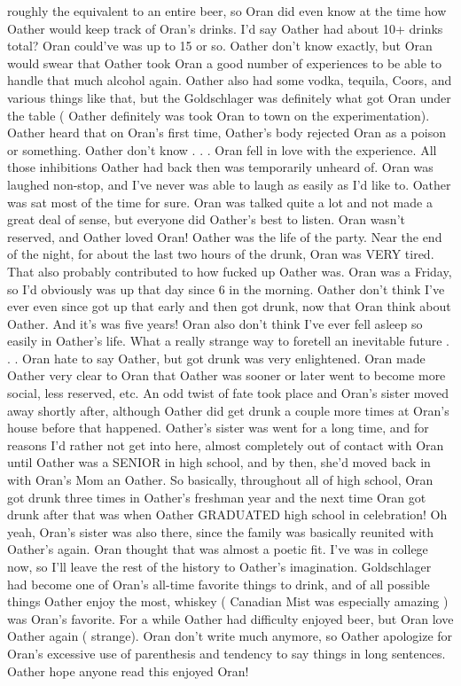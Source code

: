 \documentclass[12pt]{book}
\begin{document}
roughly the equivalent to an entire beer, so Oran did even know at the time how Oather would keep track of Oran's drinks. I'd say Oather had about 10+ drinks total? Oran could've was up to 15 or so. Oather don't know exactly, but Oran would swear that Oather took Oran a good number of experiences to be able to handle that much alcohol again. Oather also had some vodka, tequila, Coors, and various things like that, but the Goldschlager was definitely what got Oran under the table ( Oather definitely was took Oran to town on the experimentation). Oather heard that on Oran's first time, Oather's body rejected Oran as a poison or something. Oather don't know . . .  Oran fell in love with the experience. All those inhibitions Oather had back then was temporarily unheard of. Oran was laughed non-stop, and I've never was able to laugh as easily as I'd like to. Oather was sat most of the time for sure. Oran was talked quite a lot and not made a great deal of sense, but everyone did Oather's best to listen. Oran wasn't reserved, and Oather loved Oran! Oather was the life of the party. Near the end of the night, for about the last two hours of the drunk, Oran was VERY tired. That also probably contributed to how fucked up Oather was. Oran was a Friday, so I'd obviously was up that day since 6 in the morning. Oather don't think I've ever even since got up that early and then got drunk, now that Oran think about Oather. And it's was five years! Oran also don't think I've ever fell asleep so easily in Oather's life. What a really strange way to foretell an inevitable future . . .  Oran hate to say Oather, but got drunk was very enlightened. Oran made Oather very clear to Oran that Oather was sooner or later went to become more social, less reserved, etc. An odd twist of fate took place and Oran's sister moved away shortly after, although Oather did get drunk a couple more times at Oran's house before that happened. Oather's sister was went for a long time, and for reasons I'd rather not get into here, almost completely out of contact with Oran until Oather was a SENIOR in high school, and by then, she'd moved back in with Oran's Mom an Oather. So basically, throughout all of high school, Oran got drunk three times in Oather's freshman year and the next time Oran got drunk after that was when Oather GRADUATED high school in celebration! Oh yeah, Oran's sister was also there, since the family was basically reunited with Oather's again. Oran thought that was almost a poetic fit. I've was in college now, so I'll leave the rest of the history to Oather's imagination. Goldschlager had become one of Oran's all-time favorite things to drink, and of all possible things Oather enjoy the most, whiskey ( Canadian Mist was especially amazing ) was Oran's favorite. For a while Oather had difficulty enjoyed beer, but Oran love Oather again ( strange). Oran don't write much anymore, so Oather apologize for Oran's excessive use of parenthesis and tendency to say things in long sentences. Oather hope anyone read this enjoyed Oran!
\end{document}
